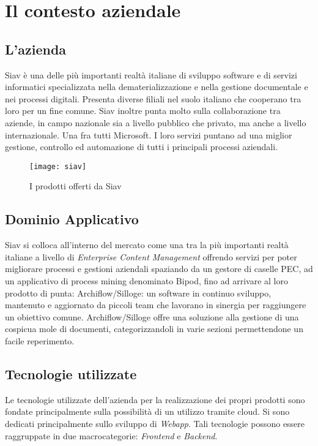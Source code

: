 
\chapter{Il contesto aziendale}

\section{L'azienda}

Siav è una delle più importanti realtà italiane di sviluppo software e di servizi informatici
specializzata nella dematerializzazione e nella gestione documentale e nei processi
digitali. Presenta diverse filiali nel suolo italiano che cooperano tra loro per un fine comune. Siav inoltre punta molto sulla collaborazione tra aziende, in campo nazionale sia a livello pubblico che privato, ma anche a livello internazionale. Una fra tutti Microsoft.
I loro servizi puntano ad una miglior gestione, controllo ed automazione di tutti i principali processi aziendali.
\begin{figure}[!h] 
	\centering 
	\texttt{[image: siav]} 
	\caption{I prodotti offerti da Siav}
\end{figure}

\section {Dominio Applicativo}
Siav si colloca all'interno del mercato come una tra la più importanti realtà italiane a livello di \textit{Enterprise Content Management} offrendo servizi per poter migliorare processi e gestioni aziendali spaziando da un gestore di caselle PEC, ad un applicativo di process mining denominato Bipod, fino ad arrivare al loro prodotto di punta: Archiflow/Silloge: un software in continuo sviluppo, mantenuto e aggiornato da piccoli team che lavorano in sinergia per raggiungere un obiettivo comune. Archiflow/Silloge offre una soluzione alla gestione di una cospicua mole di documenti, categorizzandoli in varie sezioni permettendone un facile reperimento.

\section {Tecnologie utilizzate}
Le tecnologie utilizzate dell'azienda per la realizzazione dei propri prodotti sono fondate principalmente sulla possibilità di un utilizzo tramite cloud. Si sono dedicati principalmente sullo sviluppo di \textit{Webapp}. Tali tecnologie possono essere raggruppate in due macrocategorie: \textit{Frontend} e \textit{Backend}.
